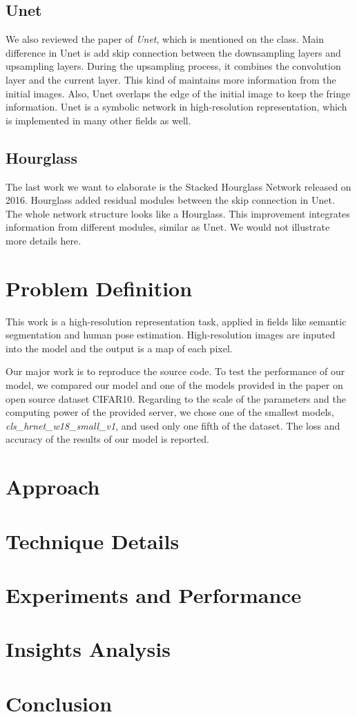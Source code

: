 \documentclass[10pt,twocolumn,letterpaper]{article}
\begin{document}
\subsection{Unet}

We also reviewed the paper of \emph{Unet}, which is mentioned on the class.\cite{ronneberger2015unet}
Main difference in Unet is add skip connection between the downsampling layers and upsampling layers.
During the upsampling process,
it combines the convolution layer and the current layer.
This kind of maintains more information from the initial images.
Also, Unet overlaps the edge of the initial image to keep the fringe information.
Unet is a symbolic network in high-resolution representation,
which is implemented in many other fields as well.

\subsection{Hourglass}

The last work we want to elaborate is the Stacked Hourglass Network released on 2016.\cite{alej2016stacked}
Hourglass added residual modules between the skip connection in Unet.
The whole network structure looks like a Hourglass.
This improvement integrates information from different modules,
similar as Unet.
We would not illustrate more details here.

\section{Problem Definition}

This work is a high-resolution representation task,
applied in fields  like semantic segmentation and human pose estimation.
High-resolution images are inputed into the model and the output is a map of each pixel.

Our major work is to reproduce the source code.
To test the performance of our model,
we compared our model and one of the models provided in the paper on open source dataset CIFAR10.
Regarding to the scale of the parameters and the computing power of the provided server,
we chose one of the smallest models, \emph{cls\_hrnet\_w18\_small\_v1}, and used only one fifth of the dataset.
The loss and accuracy of the results of our model is reported.

\section{Approach}

\section{Technique Details}

\section{Experiments and Performance}

\section{Insights Analysis}

\section{Conclusion}

{\small


}
\end{document}
